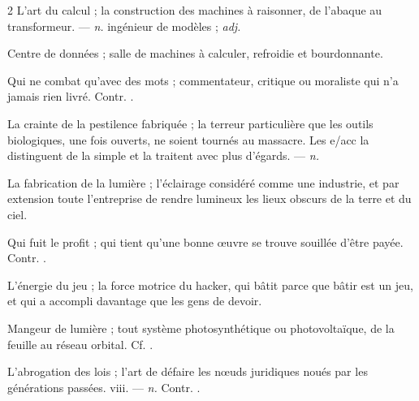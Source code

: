 \begin{multicols}{2}
 L'art du calcul ; la construction des machines à raisonner, de l'abaque au transformeur. —  \textit{n.} ingénieur de modèles ;  \textit{adj.}

 Centre de données ; salle de machines à calculer, refroidie et bourdonnante.  

 Qui ne combat qu'avec des mots ; commentateur, critique ou moraliste qui n'a jamais rien livré.  Contr. .

 La crainte de la pestilence fabriquée ; la terreur particulière que les outils biologiques, une fois ouverts, ne soient tournés au massacre. Les e/acc la distinguent de la simple  et la traitent avec plus d'égards. —  \textit{n.}

 La fabrication de la lumière ; l'éclairage considéré comme une industrie, et par extension toute l'entreprise de rendre lumineux les lieux obscurs de la terre et du ciel.

 Qui fuit le profit ; qui tient qu'une bonne œuvre se trouve souillée d'être payée. Contr. .

 L'énergie du jeu ; la force motrice du hacker, qui bâtit parce que bâtir est un jeu, et qui a accompli davantage que les gens de devoir.  

 Mangeur de lumière ; tout système photosynthétique ou photovoltaïque, de la feuille au réseau orbital. Cf. .

 L'abrogation des lois ; l'art de défaire les nœuds juridiques noués par les générations passées.   viii. —  \textit{n.} Contr. .

\end{multicols}

